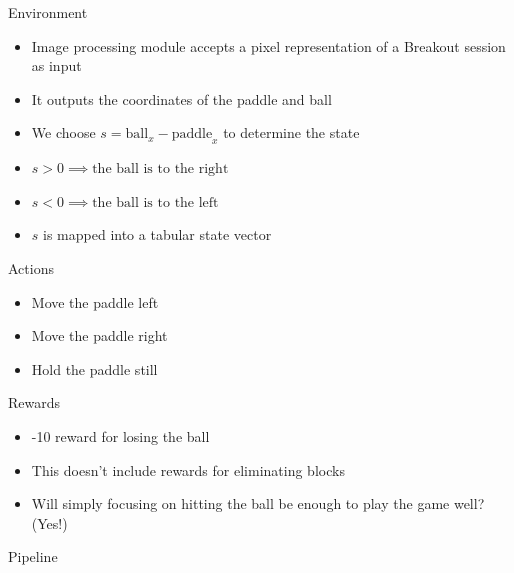 \documentclass{beamer}
\begin{document}
\begin{frame}{Environment}
  \begin{itemize}
    \item Image processing module accepts a pixel representation of a Breakout session as input
    \item It outputs the coordinates of the paddle and ball
  \end{itemize}
  \vspace{2em}
  \begin{itemize}
    \item We choose $s = \text{ball}_{x} - \text{paddle}_{x}$ to determine the state
    \item $s > 0 \implies \text{the ball is to the right}$
    \item $s < 0 \implies \text{the ball is to the left}$
  \end{itemize}
  \vspace{2em}
  \begin{itemize}
    \item $s$ is mapped into a tabular state vector
  \end{itemize}
\end{frame}

\begin{frame}{Actions}
  \begin{itemize}
    \item Move the paddle left
    \item Move the paddle right
    \item Hold the paddle still
  \end{itemize}
\end{frame}

\begin{frame}{Rewards}
  \begin{itemize}
    \item -10 reward for losing the ball
  \end{itemize}
  \vspace{2em}
  \begin{itemize}
    \item This doesn't include rewards for eliminating blocks
    \item Will simply focusing on hitting the ball be enough to play the game well? (Yes!)
  \end{itemize}
\end{frame}

\begin{frame}{Pipeline}
  \centering
\end{frame}
\end{document}
